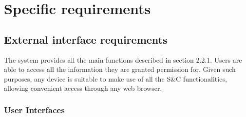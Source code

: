 \chapter{Specific requirements}

\section{External interface requirements}

The system provides all the main functions described in section 2.2.1.
Users are able to access all the information they are granted permission for.
Given such purposes, any device is suitable to make use of all the S\&C functionalities, allowing convenient access through any web browser.

\subsection{User Interfaces}

